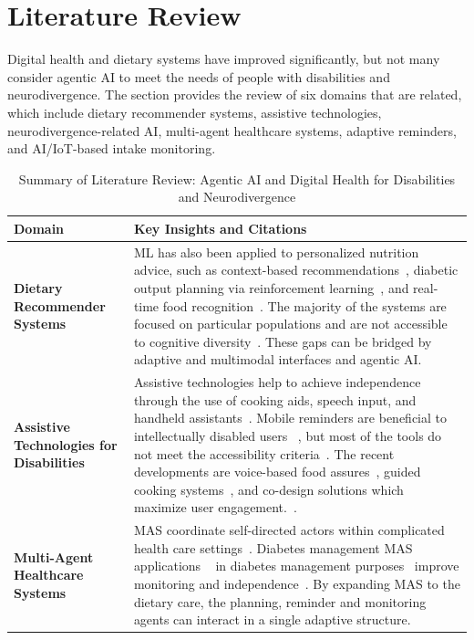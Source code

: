 \documentclass[pdflatex,sn-mathphys-num]{sn-jnl}
\begin{document}
	
	
\section{Literature Review}

Digital health and dietary systems have improved significantly, but not many consider agentic AI to meet the needs of people with disabilities and neurodivergence. The section provides the review of six domains that are related, which include dietary recommender systems, assistive technologies, neurodivergence-related AI, multi-agent healthcare systems, adaptive reminders, and AI/IoT-based intake monitoring.

\begin{table}[htbp]

	\centering
	\caption{Summary of Literature Review: Agentic AI and Digital Health for Disabilities and Neurodivergence}
	\label{tab:literature-review}
	\renewcommand{\arraystretch}{1.5} %
	\begin{tabular}{p{4cm} p{9cm}}
		\hline
		\textbf{Domain} & \textbf{Key Insights and Citations} \\
		\hline
		\textbf{Dietary Recommender Systems} & 
		ML has also been applied to personalized nutrition advice, such as context-based recommendations~\cite{Elsweiler2017}, diabetic output planning via reinforcement learning~\cite{Alferi2020}, and real-time food recognition~\cite{Kong2022,Mertes2021}. The majority of the systems are focused on particular populations and are not accessible to cognitive diversity~\cite{Fallaize2019}. These gaps can be bridged by adaptive and multimodal interfaces and agentic AI. \\[0.5em]
		
		\textbf{Assistive Technologies for Disabilities} & 
		Assistive technologies help to achieve independence through the use of cooking aids, speech input, and handheld assistants~\cite{Emerson2019}. Mobile reminders are beneficial to intellectually disabled users ~\cite{Chu2019}, but most of the tools do not meet the accessibility criteria~\cite{Milton2018}. The recent developments are voice-based food assures~\cite{Garcia2020}, guided cooking systems~\cite{Zhang2021}, and co-design solutions which maximize user engagement.~\cite{Shinohara2016}. \\[0.5em]
		
		\textbf{Multi-Agent Healthcare Systems} & 
	MAS coordinate self-directed actors within complicated health care settings~\cite{jennings2000}. Diabetes management MAS applications ~\cite{Lemke2022} in diabetes management purposes ~\cite{Choudhury2023}improve monitoring and independence~\cite{Chao2020}. By expanding MAS to the dietary care, the planning, reminder and monitoring agents can interact in a single adaptive structure. \\[0.5em]
		

\end{tabular}
\end{table}
\end{document}
